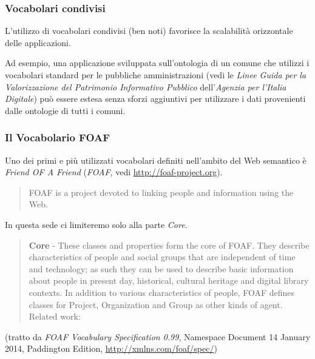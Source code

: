 \documentclass[8pt]{beamer}
\begin{document}
\begin{frame}
\frametitle{Vocabolari condivisi}

L'utilizzo di vocabolari condivisi (ben noti) favorisce la 
scalabilit\`a orizzontale delle applicazioni. 
\vspace{\baselineskip}

Ad esempio, una 
applicazione sviluppata sull'ontologia di un comune che utilizzi 
i vocabolari standard per le pubbliche amministrazioni (vedi le \emph{Linee 
Guida per la Valorizzazione del Patrimonio Informativo Pubblico} dell'\emph{Agenzia per l'Italia Digitale}) 
pu\`o essere estesa senza sforzi aggiuntivi per utilizzare i dati provenienti
dalle ontologie di tutti i comuni.
\end{frame}


\begin{frame}
\frametitle{Il Vocabolario FOAF}
Uno dei primi e pi\`u utilizzati vocabolari definiti nell'ambito
del Web semantico \`e \emph{Friend OF A Friend} (\emph{FOAF}, vedi \url{http://foaf-project.org}).
\vspace{\baselineskip}


\begin{quote}
FOAF is a project devoted to linking people and information using the Web. 
\end{quote}

In questa sede ci limiteremo solo alla parte \emph{Core}.
\begin{quote}
\textbf{Core} - These classes and properties form the core of FOAF. They
describe characteristics of people and social groups that are
independent of time and technology; as such they can be used to
describe basic information about people in present day, historical,
cultural heritage and digital library contexts. In addition to various
characteristics of people, FOAF defines classes for Project,
Organization and Group as other kinds of agent. Related work: 
\end{quote}
(tratto da \emph{FOAF Vocabulary Specification 0.99},
Namespace Document 14 January 2014, Paddington Edition, \url{http://xmlns.com/foaf/spec/})
\end{frame}
\end{document}
